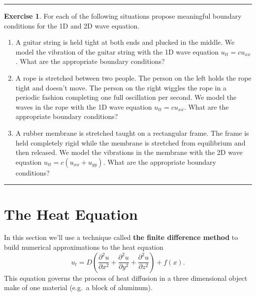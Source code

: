 \documentclass[
]{book}
\providecommand{\tightlist}{%
  \setlength{\itemsep}{0pt}\setlength{\parskip}{0pt}}
\theoremstyle{definition}
\theoremstyle{definition}
\theoremstyle{definition}
\newtheorem{exercise}{Exercise}[chapter]
\theoremstyle{remark}
\begin{document}
\begin{center}\rule{0.5\linewidth}{0.5pt}\end{center}

\begin{exercise}
\protect\hypertarget{exr:unnamed-chunk-544}{}{\label{exr:unnamed-chunk-544} }For each of the following situations propose meaningful boundary conditions for the 1D and 2D wave equation.

\begin{enumerate}
\def\labelenumi{\alph{enumi}.}
\tightlist
\item
  A guitar string is held tight at both ends and plucked in the middle. We model the vibration of the guitar string with the 1D wave equation \(u_{tt} = c u_{xx}\). What are the appropriate boundary conditions?
\item
  A rope is stretched between two people. The person on the left holds the rope tight and doesn't move. The person on the right wiggles the rope in a periodic fashion completing one full oscillation per second. We model the waves in the rope with the 1D wave equation \(u_{tt} = c u_{xx}\). What are the appropriate boundary conditions?
\item
  A rubber membrane is stretched taught on a rectangular frame. The frame is held completely rigid while the membrane is stretched from equilibrium and then released. We model the vibrations in the membrane with the 2D wave equation \(u_{tt} = c (u_{xx} + u_{yy})\). What are the appropriate boundary conditions?
\end{enumerate}
\end{exercise}

\begin{center}\rule{0.5\linewidth}{0.5pt}\end{center}

\hypertarget{the-heat-equation}{%
\section{The Heat Equation}\label{the-heat-equation}}

In this section we'll use a technique called \textbf{the finite difference method} to build numerical approximations to the heat equation
\[u_t = D \left( \frac{\partial^2 u}{\partial x^2} + \frac{\partial^2 u}{\partial y^2} + \frac{\partial^2 u}{\partial z^2} \right) + f(x).\]
This equation governs the process of heat diffusion in a three dimensional object make of one material (e.g.~a block of aluminum).
\end{document}
